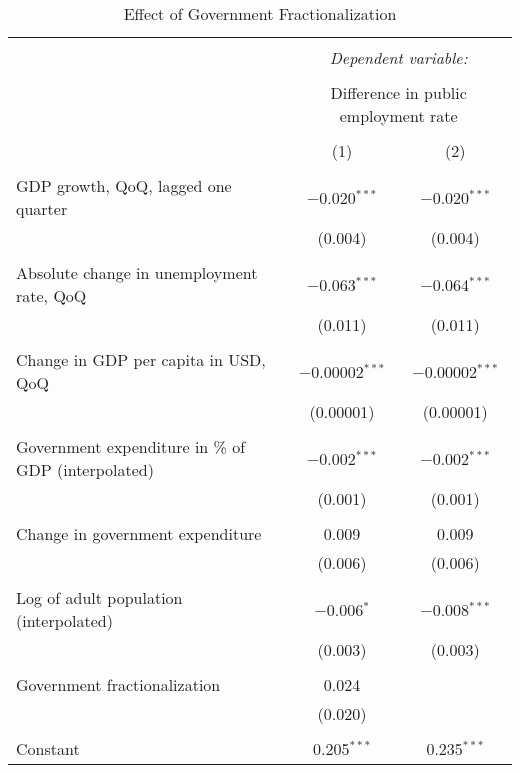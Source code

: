 
\begin{table}[!htbp] \centering 
  \caption{Effect of Government Fractionalization} 
  \label{} 
\begin{tabular}{@{\extracolsep{5pt}}lcc} 
\\[-1.8ex]\hline 
\hline \\[-1.8ex] 
 & \multicolumn{2}{c}{\textit{Dependent variable:}} \\ 
\cline{2-3} 
\\[-1.8ex] & \multicolumn{2}{c}{Difference in public employment rate} \\ 
\\[-1.8ex] & (1) & (2)\\ 
\hline \\[-1.8ex] 
 GDP growth, QoQ, lagged one quarter & $-$0.020$^{***}$ & $-$0.020$^{***}$ \\ 
  & (0.004) & (0.004) \\ 
  & & \\ 
 Absolute change in unemployment rate, QoQ & $-$0.063$^{***}$ & $-$0.064$^{***}$ \\ 
  & (0.011) & (0.011) \\ 
  & & \\ 
 Change in GDP per capita in USD, QoQ & $-$0.00002$^{***}$ & $-$0.00002$^{***}$ \\ 
  & (0.00001) & (0.00001) \\ 
  & & \\ 
 Government expenditure in \% of GDP (interpolated) & $-$0.002$^{***}$ & $-$0.002$^{***}$ \\ 
  & (0.001) & (0.001) \\ 
  & & \\ 
 Change in government expenditure & 0.009 & 0.009 \\ 
  & (0.006) & (0.006) \\ 
  & & \\ 
 Log of adult population (interpolated) & $-$0.006$^{*}$ & $-$0.008$^{***}$ \\ 
  & (0.003) & (0.003) \\ 
  & & \\ 
 Government fractionalization & 0.024 &  \\ 
  & (0.020) &  \\ 
  & & \\ 
 Constant & 0.205$^{***}$ & 0.235$^{***}$ \\ 

\end{tabular}
\end{table}
